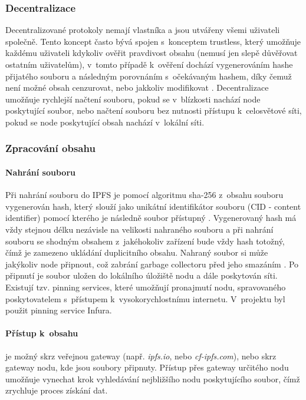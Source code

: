 \documentclass[12pt, a4paper,
  oneside,      %
]{report}
\begin{document}
\subsubsection{Decentralizace}
Decentralizované protokoly nemají vlastníka a jsou utvářeny všemi uživateli společně. Tento koncept často bývá spojen s~konceptem trustless, který umožňuje každému uživateli kdykoliv ověřit pravdivost obsahu (nemusí jen slepě důvěřovat ostatním uživatelům), v~tomto případě k~ověření dochází vygenerováním hashe přijatého souboru a následným porovnáním s~očekávaným hashem, díky čemuž není možné obsah cenzurovat, nebo jakkoliv modifikovat \cite{decentralizedVsTrustless}. Decentralizace umožňuje rychlejší načtení souboru, pokud se v~blízkosti nachází node poskytující soubor, nebo načtení souboru bez nutnosti přístupu k~celosvětové síti, pokud se node poskytující obsah nachází v~lokální síti. \cite{decentralizedAndDistributedNetworks}\cite{decentralizedAndTrustless}
\subsubsection{Zpracování obsahu}
\paragraph{Nahrání souboru}
Při nahrání souboru do IPFS je pomocí algoritmu sha-256 z~obsahu souboru vygenerován hash, který slouží jako unikátní identifikátor souboru (CID - content identifier) pomocí kterého je následně soubor přístupný \cite{IPFScontentAddressing}. Vygenerovaný hash má vždy stejnou délku nezávisle na velikosti nahraného souboru a při nahrání souboru se shodným obsahem z~jakéhokoliv zařízení bude vždy hash totožný, čímž je zamezeno ukládání duplicitního obsahu. Nahraný soubor si může jakýkoliv node připnout, což zabrání garbage collectoru před jeho smazáním \cite{IPFSPersistence}. Po připnutí je soubor uložen do lokálního úložiště nodu a dále poskytován síti. Existují tzv. pinning services, které umožňují pronajmutí nodu, spravovaného poskytovatelem s~přístupem k~vysokorychlostnímu internetu. V~projektu byl použit pinning service Infura.
\paragraph{Přístup k~obsahu} je možný skrz veřejnou gateway (např. \textit{ipfs.io}, nebo \textit{cf-ipfs.com}), nebo skrz gateway nodu, kde jsou soubory připnuty. Přístup přes gateway určitého nodu umožňuje vynechat krok vyhledávání nejbližšího nodu poskytujícího soubor, čímž zrychluje proces získání dat. \cite{IPFSgateways}
\end{document}
